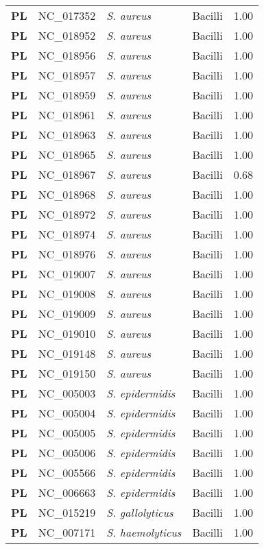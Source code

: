\begin{adjustwidth}{-3cm}{2cm}
{\begin{supertabular}{>{\bfseries}l|p{0.1\textwidth}p{0.14\textwidth}l|l}
PL & NC\_017352 & \textit{S. aureus} & Bacilli & 1.00\\
PL & NC\_018952 & \textit{S. aureus} & Bacilli & 1.00\\
PL & NC\_018956 & \textit{S. aureus} & Bacilli & 1.00\\
PL & NC\_018957 & \textit{S. aureus} & Bacilli & 1.00\\
PL & NC\_018959 & \textit{S. aureus} & Bacilli & 1.00\\
PL & NC\_018961 & \textit{S. aureus} & Bacilli & 1.00\\
PL & NC\_018963 & \textit{S. aureus} & Bacilli & 1.00\\
PL & NC\_018965 & \textit{S. aureus} & Bacilli & 1.00\\
PL & NC\_018967 & \textit{S. aureus} & Bacilli & 0.68\\
PL & NC\_018968 & \textit{S. aureus} & Bacilli & 1.00\\
PL & NC\_018972 & \textit{S. aureus} & Bacilli & 1.00\\
PL & NC\_018974 & \textit{S. aureus} & Bacilli & 1.00\\
PL & NC\_018976 & \textit{S. aureus} & Bacilli & 1.00\\
PL & NC\_019007 & \textit{S. aureus} & Bacilli & 1.00\\
PL & NC\_019008 & \textit{S. aureus} & Bacilli & 1.00\\
PL & NC\_019009 & \textit{S. aureus} & Bacilli & 1.00\\
PL & NC\_019010 & \textit{S. aureus} & Bacilli & 1.00\\
PL & NC\_019148 & \textit{S. aureus} & Bacilli & 1.00\\
PL & NC\_019150 & \textit{S. aureus} & Bacilli & 1.00\\
PL & NC\_005003 & \textit{S. epidermidis} & Bacilli & 1.00\\
PL & NC\_005004 & \textit{S. epidermidis} & Bacilli & 1.00\\
PL & NC\_005005 & \textit{S. epidermidis} & Bacilli & 1.00\\
PL & NC\_005006 & \textit{S. epidermidis} & Bacilli & 1.00\\
PL & NC\_005566 & \textit{S. epidermidis} & Bacilli & 1.00\\
PL & NC\_006663 & \textit{S. epidermidis} & Bacilli & 1.00\\
PL & NC\_015219 & \textit{S. gallolyticus} & Bacilli & 1.00\\
PL & NC\_007171 & \textit{S. haemolyticus} & Bacilli & 1.00\\

\end{supertabular}}
\end{adjustwidth}
